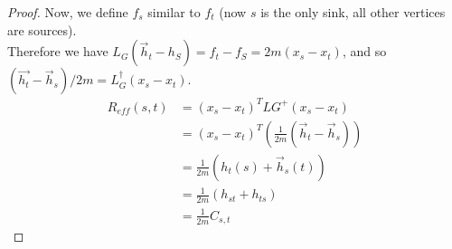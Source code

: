 \documentclass[12pt]{article}
\begin{document}
\begin{proof}
	\newline
	Now, we define $f_s$ similar to $f_t$ (now $s$ is the only sink, all other vertices are sources).\\
	\newline
	Therefore we have $L _ { G } \left( \vec { h } _ { t } - h _ { S } \right) = f _ { t } - f _ { S } = 2 m \left( x _ { s } - x _ { t } \right)$, and so $\left( \vec { h _ { t } } - \vec { h } _ { s } \right) / 2 m = L _ { G } ^ { \dagger } \left( x _ { s } - x _ { t } \right)$. 
	\begin{align*}
	R _ { e f f } ( s , t ) &=( x _ { s } - x _ { t })^T L{G}^{+}( x _ { s } - x _ { t }) \\
							&= \left( x _ { s } - x _ { t } \right) ^ { T } \left( \frac { 1 } { 2 m } \left( \vec { h } _ { t } - \vec { h } _ { s } \right) \right) \\
							&= \frac { 1 } { 2 m } \left( h _ { t } ( s ) + \vec { h } _ { s } ( t ) \right) \\
							&= \frac { 1 } { 2 m } \left( h _ { s t } + h _ { t s } \right)\\
							&= \frac { 1 } { 2 m } C_{s, t}
	\end{align*}
\end{proof}
\end{document}
